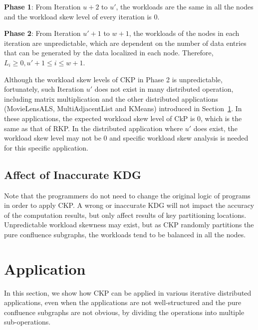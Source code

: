 \documentclass[10pt,journal,compsoc]{IEEEtran}
\begin{document}
\textbf{Phase 1}: From Iteration $u+2$ to $u'$, 
the workloads are the same in all the nodes and the workload skew level of every iteration is 0.

\textbf{Phase 2}: From Iteration $u'+1$ to $w+1$, 
the workloads of the nodes in each iteration are unpredictable, 
which are dependent on the number of data entries that can be generated by the data localized in each node. Therefore, $L_i \geq 0, u'+1 \leq i \leq w+1$.

Although the workload skew levels of CKP in Phase 2 is unpredictable,
fortunately, such Iteration $u'$ does not exist in many distributed operation, 
including matrix multiplication and the other distributed applications (MovieLensALS, MultiAdjacentList and KMeans) introduced in Section~\ref{section:application}. 
In these applications, the expected workload skew level of CkP is 0, which is the same as that of RKP.
In the distributed application where $u'$ does exist, the workload skew level may not be 0 and specific workload skew analysis is needed for this specific application.


\subsection{Affect of Inaccurate KDG}\label{section:inaccurate}
Note that the programmers do not need to change the original logic of programs 
in order to apply CKP. 
A wrong or inaccurate KDG will not impact the accuracy of the computation results, but only affect results of key partitioning locations. 
Unpredictable workload skewness may exist, but as CKP randomly partitions the pure confluence subgraphs, the workloads tend to be balanced in all the nodes. 




\section{Application}\label{section:application}
In this section, we show how CKP can be applied in various
iterative distributed applications, even when the applications are not well-structured and the pure confluence subgraphs
are not obvious, by dividing the operations into multiple sub-operations.
\end{document}
